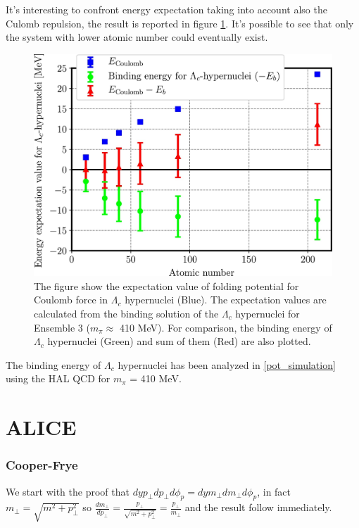\documentclass[12pt,a4paper]{book}
\begin{document}
	It's interesting to confront energy expectation taking into account also the Culomb repulsion, the result is reported in figure \ref{fig:binding_culomb}. It's possible to see that only the system with lower atomic number could eventually exist.
	
	\begin{figure}
		\centering
		\includegraphics[width=0.74 \linewidth]{pictures/binding_culomb.jpg}
		\caption{The figure show the expectation value of folding potential for Coulomb force in $\Lambda_c$ hypernuclei (Blue). The expectation values are calculated from the binding solution of the $\Lambda_c$ hypernuclei for Ensemble 3 ($m_\pi \approx$ 410 MeV). For comparison, the binding energy of $\Lambda_c$ hypernuclei (Green) and sum of them (Red) are also plotted.}
		\label{fig:binding_culomb}
	\end{figure}
	
	
	
	
	The binding energy of $\Lambda_c$ hypernuclei has been analyzed in \ref{pot_simulation} using the HAL QCD for $m_\pi$ = 410 MeV. 
	
	
	\newpage
	
	\chapter{ALICE}
	
	\appendix
	\subsection{Cooper-Frye}
	We start with the proof that $dy p_\perp dp_\perp d\phi_p = dy m_\perp dm_\perp d\phi_p$, in fact $m_\perp=\sqrt{m^2 + p_\perp^2}$ so $\frac{dm_\perp}{dp_\perp}= \frac{p_\perp}{\sqrt{m^2 + p_\perp^2}} = \frac{p_\perp}{m_\perp}$ and the result follow immediately.
	
\end{document}
